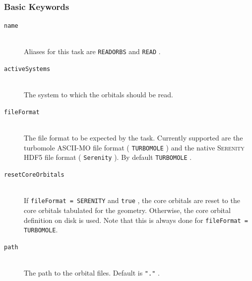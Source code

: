 \documentclass[bibliography=totocnumbered,a4paper,10pt,oneside]{scrbook}
\newcommand{\ttt}[1]{%
  \begingroup\setlength{\fboxsep}{1pt}%
  \colorbox{serenity-green!30}{\texttt{\hspace*{2pt}\vphantom{(g}#1\hspace*{2pt}}}%
  \endgroup
}
\begin{document}
\subsubsection{Basic Keywords}
\begin{description}
 \item [\texttt{name}]\hfill \\
  Aliases for this task are \ttt{READORBS} and \ttt{READ}.
 \item [\texttt{activeSystems}]\hfill \\
  The system to which the orbitals should be read.
 \item [\texttt{fileFormat}]\hfill \\
  The file format to be expected by the task. Currently supported are the turbomole ASCII-MO file format (\ttt{TURBOMOLE})
  and the native \textsc{Serenity} HDF5 file format (\ttt{Serenity}). By default \ttt{TURBOMOLE}.
 \item [\texttt{resetCoreOrbitals}]\hfill \\
  If \texttt{fileFormat = SERENITY} and \ttt{true}, the core orbitals are reset to the core orbitals tabulated for the geometry. Otherwise, the core orbital
  definition on disk is used. Note that this is always done for \texttt{fileFormat = TURBOMOLE}.
 \item [\texttt{path}]\hfill \\
  The path to the orbital files. Default is \ttt{"."}.
\end{description}
\end{document}
